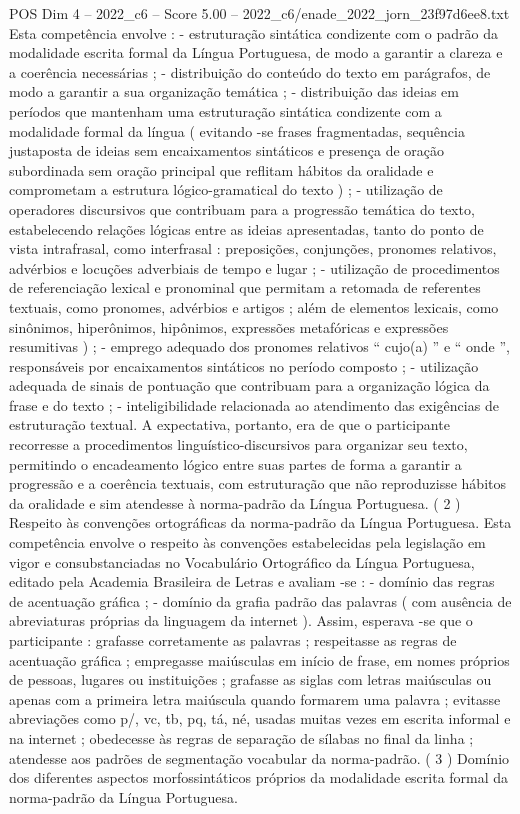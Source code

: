 \begin{textsample}{POS Dim 4 – 2022\_c6 – Score 5.00 – 2022\_c6/enade\_2022\_jorn\_23f97d6ee8.txt}
Esta competência envolve : - estruturação sintática condizente com o padrão da modalidade escrita formal da Língua Portuguesa, de modo a garantir a clareza e a coerência necessárias ; - distribuição do conteúdo do texto em parágrafos, de modo a garantir a sua organização temática ; - distribuição das ideias em períodos que mantenham uma estruturação sintática condizente com a modalidade formal da língua ( evitando -se frases fragmentadas, sequência justaposta de ideias sem encaixamentos sintáticos e presença de oração subordinada sem oração principal que reflitam hábitos da oralidade e comprometam a estrutura lógico-gramatical do texto ) ; - utilização de operadores discursivos que contribuam para a progressão temática do texto, estabelecendo relações lógicas entre as ideias apresentadas, tanto do ponto de vista intrafrasal, como interfrasal : preposições, conjunções, pronomes relativos, advérbios e locuções adverbiais de tempo e lugar ; - utilização de procedimentos de referenciação lexical e pronominal que permitam a retomada de referentes textuais, como pronomes, advérbios e artigos ; além de elementos lexicais, como sinônimos, hiperônimos, hipônimos, expressões metafóricas e expressões resumitivas ) ; - emprego adequado dos pronomes relativos “ cujo(a) ” e “ onde ”, responsáveis por encaixamentos sintáticos no período composto ; - utilização adequada de sinais de pontuação que contribuam para a organização lógica da frase e do texto ; - inteligibilidade relacionada ao atendimento das exigências de estruturação textual.
A expectativa, portanto, era de que o participante recorresse a procedimentos linguístico-discursivos para organizar seu texto, permitindo o encadeamento lógico entre suas partes de forma a garantir a progressão e a coerência textuais, com estruturação que não reproduzisse hábitos da oralidade e sim atendesse à norma-padrão da Língua Portuguesa. ( 2 ) Respeito às convenções ortográficas da norma-padrão da Língua Portuguesa.
Esta competência envolve o respeito às convenções estabelecidas pela legislação em vigor e consubstanciadas no Vocabulário Ortográfico da Língua Portuguesa, editado pela Academia Brasileira de Letras e avaliam -se : - domínio das regras de acentuação gráfica ; - domínio da grafia padrão das palavras ( com ausência de abreviaturas próprias da linguagem da internet ).
Assim, esperava -se que o participante : grafasse corretamente as palavras ; respeitasse as regras de acentuação gráfica ; empregasse maiúsculas em início de frase, em nomes próprios de pessoas, lugares ou instituições ; grafasse as siglas com letras maiúsculas ou apenas com a primeira letra maiúscula quando formarem uma palavra ; evitasse abreviações como p/, vc, tb, pq, tá, né, usadas muitas vezes em escrita informal e na internet ; obedecesse às regras de separação de sílabas no final da linha ; atendesse aos padrões de segmentação vocabular da norma-padrão. ( 3 ) Domínio dos diferentes aspectos morfossintáticos próprios da modalidade escrita formal da norma-padrão da Língua Portuguesa.

\end{textsample}

